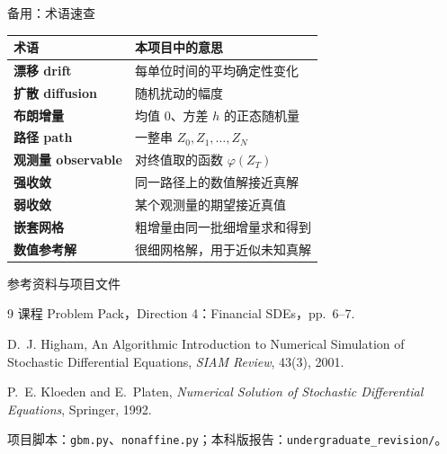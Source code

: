 \documentclass[aspectratio=169,10pt,fontset=none]{ctexbeamer}
\newcommand{\code}[1]{\texttt{#1}}
\begin{document}
\begin{frame}{备用：术语速查}
  \begin{tabularx}{\textwidth}{>{\bfseries}p{3.1cm}X}
    \toprule
    术语 & 本项目中的意思 \\
    \midrule
    漂移 drift & 每单位时间的平均确定性变化 \\
    扩散 diffusion & 随机扰动的幅度 \\
    布朗增量 & 均值 $0$、方差 $h$ 的正态随机量 \\
    路径 path & 一整串 $Z_0,Z_1,\ldots,Z_N$ \\
    观测量 observable & 对终值取的函数 $\varphi(Z_T)$ \\
    强收敛 & 同一路径上的数值解接近真解 \\
    弱收敛 & 某个观测量的期望接近真值 \\
    嵌套网格 & 粗增量由同一批细增量求和得到 \\
    数值参考解 & 很细网格解，用于近似未知真解 \\
    \bottomrule
  \end{tabularx}
\end{frame}

\begin{frame}{参考资料与项目文件}
  \begin{thebibliography}{9}
    课程 Problem Pack，Direction 4：Financial SDEs，pp.~6--7.

    D.~J. Higham,
    \newblock An Algorithmic Introduction to Numerical Simulation of Stochastic Differential Equations,
    \newblock \emph{SIAM Review}, 43(3), 2001.

    P.~E. Kloeden and E.~Platen,
    \newblock \emph{Numerical Solution of Stochastic Differential Equations},
    \newblock Springer, 1992.
  \end{thebibliography}
  \vspace{0.3em}
  \small 项目脚本：\code{gbm.py}、\code{nonaffine.py}；本科版报告：\code{undergraduate\_revision/}。
\end{frame}
\end{document}
